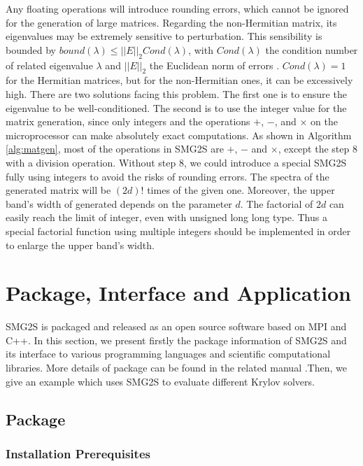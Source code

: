 Any floating operations will introduce rounding errors, which cannot be ignored for the generation of large matrices. Regarding the non-Hermitian matrix, its eigenvalues may be extremely sensitive to perturbation. This sensibility is bounded by $bound(\lambda) \leq ||E||_2Cond(\lambda)$, with $Cond(\lambda)$ the condition number of related eigenvalue $\lambda$ and $||E||_2$ the Euclidean norm of errors \cite{saad2011numerical}. $Cond(\lambda)=1$ for the Hermitian matrices, but for the non-Hermitian ones, it can be excessively high. There are two solutions facing this problem. The first one is to ensure the eigenvalue to be well-conditioned. The second is to use the integer value for the matrix generation, since only integers and the operations $+$, $-$, and $\times$ on the microprocessor can make absolutely exact computations. As shown in Algorithm \ref{alg:matgen}, most of the operations in SMG2S are $+$, $-$ and $\times$, except the step 8 with a division operation. Without step 8, we could introduce a special SMG2S fully using integers to avoid the risks of rounding errors. The spectra of the generated matrix will be $(2d)!$ times of the given one. Moreover, the upper band's width of generated depends on the parameter $d$. The factorial of $2d$ can easily reach the limit of integer, even with unsigned long long type. Thus a special factorial function using multiple integers should be implemented in order to enlarge the upper band's width.

\section{Package, Interface and Application}

SMG2S is packaged and released as an open source software based on MPI and C++. In this section, we present firstly the package information of SMG2S and its interface to various programming languages and scientific computational libraries. More details of package can be found in the related manual \cite{wu2018smg2s}.Then, we give an example which uses SMG2S to evaluate different Krylov solvers. 

\subsection{Package}

\subsubsection{Installation Prerequisites}

